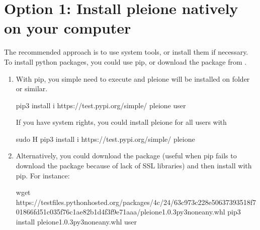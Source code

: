 \documentclass[letterpaper,10pt,english]{sphinxmanual}
\begin{document}
\section{Option 1: Install pleione natively on your computer}
\label{\detokenize{Installation:option-1-install-pleione-natively-on-your-computer}}
The recommended approach is to use system tools, or install them if
necessary. To install python packages, you could use pip, or download
the package from .
\begin{enumerate}
\def\theenumi{\arabic{enumi}}
\def\labelenumi{\theenumi .}
\makeatletter\def\p@enumii{\p@enumi \theenumi .}\makeatother
\item {} 

With pip, you simple need to execute and pleione will be installed on
 folder or similar.

\begin{sphinxVerbatim}[commandchars=\\\{\}]
pip3 install \PYGZhy{}i https://test.pypi.org/simple/ pleione \PYGZhy{}\PYGZhy{}user
\end{sphinxVerbatim}

If you have system rights, you could install pleione for all users with

\begin{sphinxVerbatim}[commandchars=\\\{\}]
sudo \PYGZhy{}H pip3 install \PYGZhy{}i https://test.pypi.org/simple/ pleione
\end{sphinxVerbatim}

\item {} 

Alternatively, you could download the package (useful when pip fails to download
the package because of lack of SSL libraries) and then install with pip. For instance:

\begin{sphinxVerbatim}[commandchars=\\\{\}]
wget https://test\PYGZhy{}files.pythonhosted.org/packages/4c/24/63c973c228e50637393518f701866fd51c035f76c1ae82b1d4f3f9e71aaa/pleione\PYGZhy{}1.0.3\PYGZhy{}py3\PYGZhy{}none\PYGZhy{}any.whl
pip3 install pleione\PYGZhy{}1.0.3\PYGZhy{}py3\PYGZhy{}none\PYGZhy{}any.whl \PYGZhy{}\PYGZhy{}user
\end{sphinxVerbatim}


\end{enumerate}
\end{document}
